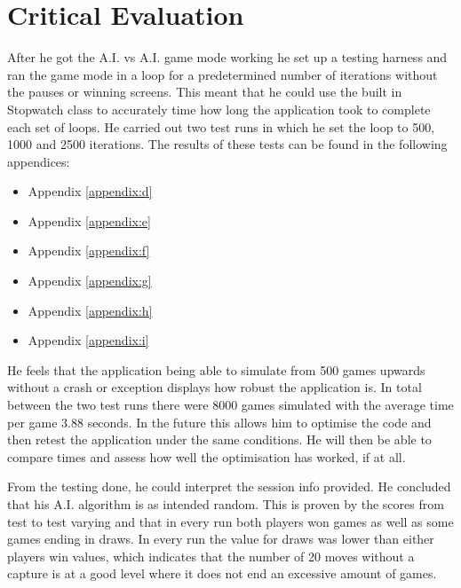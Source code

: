 \documentclass[10pt, a4paper]{article}
\begin{document}
 
 
 
 
 
 
 
 
 \section{Critical Evaluation}
After he got the A.I. vs A.I. game mode working he set up a testing harness and ran the game mode in a loop for a predetermined number of iterations without the pauses or winning screens. This meant that he could use the built in Stopwatch class to accurately time how long the application took to complete each set of loops. He carried out two test runs in which he set the loop to 500, 1000 and 2500 iterations. The results of these tests can be found in the following appendices:

\begin{itemize}
	\item Appendix \ref{appendix:d}
	\item Appendix \ref{appendix:e}
	\item Appendix \ref{appendix:f}
	\item Appendix \ref{appendix:g}
	\item Appendix \ref{appendix:h}
	\item Appendix \ref{appendix:i}
\end{itemize}

He feels that the application being able to simulate from 500 games upwards without a crash or exception displays how robust the application is. In total between the two test runs there were 8000 games simulated with the average time per game 3.88 seconds. In the future this allows him to optimise the code and then retest the application under the same conditions. He will then be able to compare times and assess how well the optimisation has worked, if at all.
\newline

 From the testing done, he could interpret the session info provided. He concluded that his A.I. algorithm is as intended random. This is proven by the scores from test to test varying and that in every run both players won games as well as some games ending in draws. In every run the value for draws was lower than either players win values, which indicates that the number of 20 moves without a capture is at a good level where it does not end an excessive amount of games.
 
\end{document}
